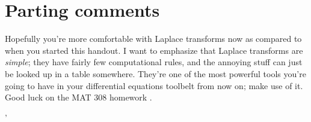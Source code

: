 \documentclass[11pt]{article}
\theoremstyle{mystyle}
\begin{document}
\section{Parting comments}

Hopefully you're more comfortable with Laplace
transforms now as compared to when you started
this handout. I want to emphasize that Laplace
transforms are \emph{simple}; they have fairly
few computational rules, and the annoying stuff
can just be looked up in a table somewhere.
They're one of the most powerful tools you're
going to have in your differential equations
toolbelt from now on; make use of it.
Good luck on the MAT 308 homework \salute.


'
\end{document}

